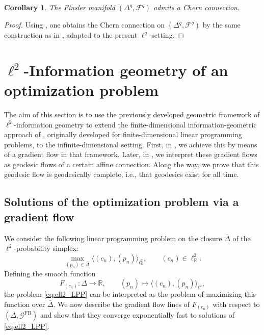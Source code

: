 \documentclass[12pt]{amsart}
\newtheorem{corollary}[corollary]{Corollary}
\numberwithin{figure}{section}
\numberwithin{table}{section}
\numberwithin{equation}{section}
\begin{document}
\begin{corollary}
    \label{T: existence chern connection on Deltaq}
    The Finsler manifold \((\Delta^q,\mathcal F^q)\) admits a Chern connection.
\end{corollary}

\begin{proof}
Using , one obtains the Chern connection on \((\Delta^q,\mathcal F^q)\) by the same construction as in \cite[Thm.~4.6]{bauerLpFisherRaoMetricAmari2024}, adapted to the present \(\ell^q\)-setting.
\end{proof}
\section{$\ell^2$-Information geometry of an optimization problem}\label{s: 3}
The aim of this section is to use the previously developed geometric framework of \(\ell^2\)-information geometry to extend the finite-dimensional information-geometric approach of \cite{faybusovich_hamiltonian_1991}, originally developed for finite-dimensional linear programming problems, to the infinite-dimensional setting. First, in , we achieve this by means of a gradient flow in that framework. Later, in , we interpret these gradient flows as geodesic flows of a certain affine connection. Along the way, we prove that this geodesic flow is geodesically complete, i.e., that geodesics exist for all time.

\subsection{Solutions of the optimization problem via a gradient flow}\label{ss:Solutions of optimization problem via a gradient flow}
We consider the following linear programming problem on the closure \(\bar{\Delta}\) of the \(\ell^2\)-probability simplex:
\begin{equation}\tag{LP}\label{eq:ell2_LPP}
	\max_{(p_n)\in \bar{\Delta}} \langle (c_n), (p_n) \rangle_{\ell^2_\mathbb{R}},
	\qquad (c_n)\in \ell^2_\mathbb{R}.
\end{equation}
Defining the smooth function
\begin{equation}\label{eq:def_F_cn}
F_{(c_n)}:\Delta\longrightarrow\mathbb{R},
\qquad (p_n)\longmapsto \langle (c_n), (p_n) \rangle_{\ell^2},
\end{equation}
the problem \eqref{eq:ell2_LPP} can be interpreted as the problem of maximizing this function over \(\bar{\Delta}\). We now describe the gradient flow lines of \(F_{(c_n)}\) with respect to \((\Delta,\mathcal{G}^{\mathrm{FR}})\) and show that they converge exponentially fast to solutions of \eqref{eq:ell2_LPP}.
\end{document}
